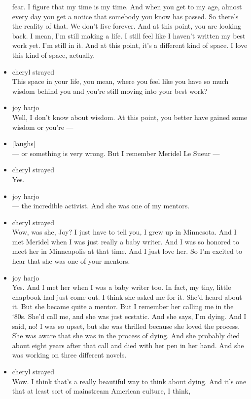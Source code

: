 \begin{itemize}
  fear. I figure that my time is my time. And when you get to my age,
  almost every day you get a notice that somebody you know has passed.
  So there's the reality of that. We don't live forever. And at this
  point, you are looking back. I mean, I'm still making a life. I still
  feel like I haven't written my best work yet. I'm still in it. And at
  this point, it's a different kind of space. I love this kind of space,
  actually.
\item
  cheryl strayed\\
  This space in your life, you mean, where you feel like you have so
  much wisdom behind you and you're still moving into your best work?
\item
  joy harjo\\
  Well, I don't know about wisdom. At this point, you better have gained
  some wisdom or you're ---
\item
  {[}laughs{]}\\
  --- or something is very wrong. But I remember Meridel Le Sueur ---
\item
  cheryl strayed\\
  Yes.
\item
  joy harjo\\
  --- the incredible activist. And she was one of my mentors.
\item
  cheryl strayed\\
  Wow, was she, Joy? I just have to tell you, I grew up in Minnesota.
  And I met Meridel when I was just really a baby writer. And I was so
  honored to meet her in Minneapolis at that time. And I just love her.
  So I'm excited to hear that she was one of your mentors.
\item
  joy harjo\\
  Yes. And I met her when I was a baby writer too. In fact, my tiny,
  little chapbook had just come out. I think she asked me for it. She'd
  heard about it. But she became quite a mentor. But I remember her
  calling me in the `80s. She'd call me, and she was just ecstatic. And
  she says, I'm dying. And I said, no! I was so upset, but she was
  thrilled because she loved the process. She was aware that she was in
  the process of dying. And she probably died about eight years after
  that call and died with her pen in her hand. And she was working on
  three different novels.
\item
  cheryl strayed\\
  Wow. I think that's a really beautiful way to think about dying. And
  it's one that at least sort of mainstream American culture, I think,

\end{itemize}
